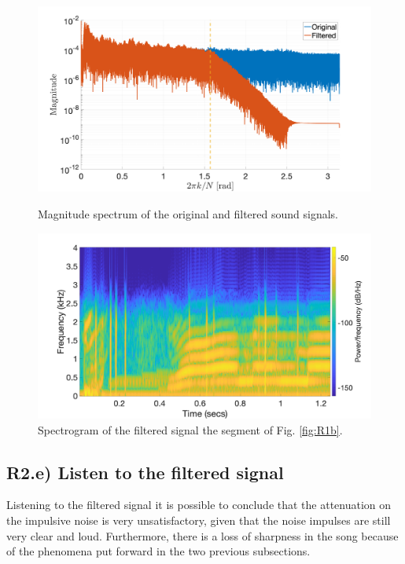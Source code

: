 \documentclass[]{scrartcl}
\begin{document}
\begin{figure}[htbp]
	\centering
	\begin{minipage}[b]{.49\textwidth}
		\centering
		\includegraphics[width= 1.1\textwidth]{figures/R2d.png}
		\caption{Magnitude spectrum of the original and filtered sound signals.}
		\label{fig:R2d}
	\end{minipage}
	\hfill
	\begin{minipage}[b]{.49\textwidth}
		\centering
		\includegraphics[width= 1.1\textwidth]{figures/R2d_spectrogram.png}
		\caption{Spectrogram of the filtered signal the segment of Fig. \ref{fig:R1b}.}
		\label{fig:Red_spectrogram}
	\end{minipage}
\end{figure}

\subsection{R2.e) Listen to the filtered signal}
Listening to the filtered signal it is possible to conclude that the attenuation on the impulsive noise is very unsatisfactory, given that the noise impulses are still very clear and loud. Furthermore, there is a loss of sharpness in the song because of the phenomena put forward in the two previous subsections.
\end{document}
